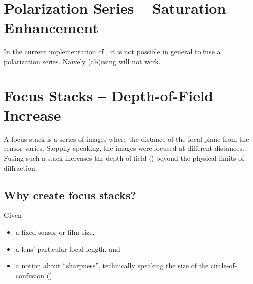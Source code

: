 


\section[Polarization Series -- Saturation Enhancement]{%
  \label{sec:polarization-series--saturation-enhancement}%
  Polarization Series -- Saturation Enhancement}


In the current implementation of \App{}, it is not possible in general to fuse a polarization
series.  Na\"ively (ab)using  will not work.


\section[Focus Stacks -- Depth-of-Field Increase]{%
  \label{sec:focus-stacks--depth-of-field-increase}%
  Focus Stacks -- Depth-of-Field Increase}


%
%
A focus stack is a series of images where the distance of the focal plane from the sensor
varies.  Sloppily speaking, the images were focused at different distances.  Fusing such a stack
increases the depth-of-field () beyond the physical limits of diffraction.


\subsection[Why create focus stacks?]{\label{sec:why-create-focus-stacks}%
  Why create focus stacks?}

Given

\begin{itemize}
\item
  a fixed sensor or film size,

\item
  a lens' particular focal length, and

\item
  a notion about ``sharpness'', technically speaking the size of the circle-of-confusion
  ()
\end{itemize}


